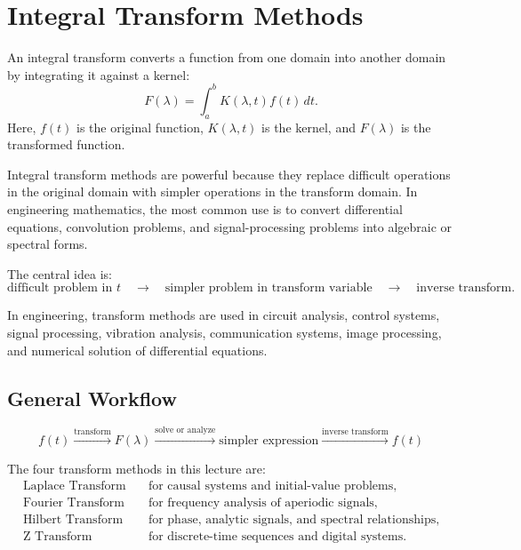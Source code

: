 \section{Integral Transform Methods}

\begin{conceptbox}
    An integral transform converts a function from one domain into another domain by integrating it against a kernel:
    \[
        F(\lambda)=\int_a^b K(\lambda,t)f(t)\,dt.
    \]
    Here, $f(t)$ is the original function, $K(\lambda,t)$ is the kernel, and $F(\lambda)$ is the transformed function.
\end{conceptbox}

Integral transform methods are powerful because they replace difficult operations in the original domain with simpler operations in the transform domain. In engineering mathematics, the most common use is to convert differential equations, convolution problems, and signal-processing problems into algebraic or spectral forms.

The central idea is:
\[
    \text{difficult problem in } t
    \quad \longrightarrow \quad
    \text{simpler problem in transform variable}
    \quad \longrightarrow \quad
    \text{inverse transform}.
\]

\begin{noteBox}
    In engineering, transform methods are used in circuit analysis, control systems, signal processing, vibration analysis, communication systems, image processing, and numerical solution of differential equations.
\end{noteBox}

\subsection*{General Workflow}

\[
    \boxed{
        f(t)
        \xrightarrow{\text{transform}}
        F(\lambda)
        \xrightarrow{\text{solve or analyze}}
        \text{simpler expression}
        \xrightarrow{\text{inverse transform}}
        f(t)
    }
\]

\begin{conceptbox}
    The four transform methods in this lecture are:
    \[
        \begin{aligned}
            \text{Laplace Transform} & \quad \text{for causal systems and initial-value problems},           \\
            \text{Fourier Transform} & \quad \text{for frequency analysis of aperiodic signals},             \\
            \text{Hilbert Transform} & \quad \text{for phase, analytic signals, and spectral relationships}, \\
            \text{Z Transform}       & \quad \text{for discrete-time sequences and digital systems}.
        \end{aligned}
    \]
\end{conceptbox}


